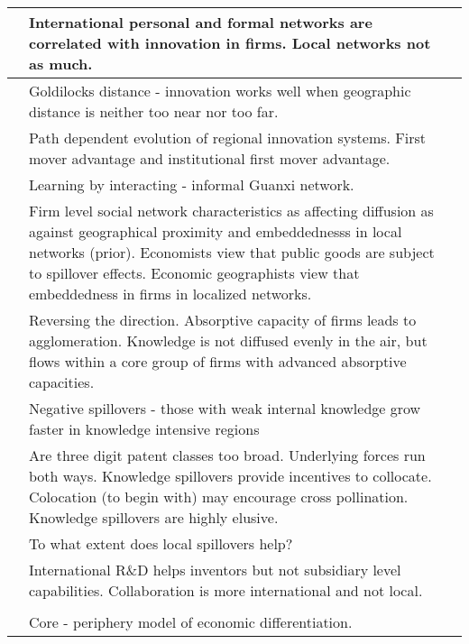 \documentclass[12pt]{article}
\begin{document}
\begin{center}
\begin{longtable}{|p{}|p{}|p{}|}
\cite{Fitjar2015} & International personal and formal networks are correlated with innovation in firms. Local networks not as much. &\\\hline

\cite{Fitjar2016} & Goldilocks distance - innovation works well when geographic distance is neither too near nor too far.&\\\hline

\cite{Fu2012} & Path dependent evolution of regional innovation systems. First mover advantage and institutional first mover advantage.&\\\hline

\cite{Fu2013} & Learning by interacting - informal Guanxi network.&\\\hline

\cite{Giuliani2007} & Firm level social network characteristics as affecting diffusion as against geographical proximity and embeddednesss in local networks (prior). Economists view that public goods are subject to spillover effects. Economic geographists view that embeddedness in firms in localized networks.&\\\hline

\cite{Giuliani2005} & Reversing the direction. Absorptive capacity of firms leads to agglomeration.  Knowledge is not diffused evenly in the air, but flows within a core group of firms with advanced absorptive capacities.&\\\hline

\cite{Grillitsch2016} & Negative spillovers - those with weak internal knowledge  grow faster in knowledge intensive regions&\\\hline

\cite{Henderson2005} & Are three digit patent classes too broad. Underlying forces run both ways. Knowledge spillovers provide incentives to collocate. Colocation (to begin with) may encourage cross pollination. Knowledge spillovers are highly elusive.&\\\hline

\cite{Huber2011} & To what extent does local spillovers help?&\\\hline

\cite{Alnuaimi2012} & International R\&D helps inventors but not subsidiary level capabilities. Collaboration is more international and not local.&\\\hline

\cite{Jaffe1993}&&\\\hline

\cite{Krugman1991} & Core - periphery model of economic differentiation.&\\\hline


\end{longtable}
\end{center}
\end{document}
